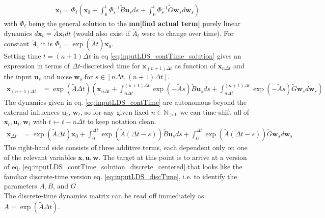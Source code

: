 \documentclass[10pt,letterpaper]{article}
\newcommand{\mn}[1]{   {\bf \color{blue}mn[#1]}  }
\newcommand{\xb}{\mathbf{x}}
\newcommand{\ub}{\mathbf{u}}
\newcommand{\wb}{\mathbf{w}}
\begin{document}
\begin{align}
\xb_t = \Phi_t \left( \xb_0 + \int_0^t \Phi_s^{-1} \tilde{B} \ub_s ds + \int_0^t \Phi_s^{-1} \tilde{G} \wb_s d\wb_s \right) \label{eq:inputLDS_contTime_solution} 
\end{align}
with $\Phi_t$ being the general solution to the \mn{find actual term} purely linear dynamics $d\xb_t = \tilde{A} \xb_t dt$ (would also exist if $\tilde{A}_t$ were to change over time). For constant $\tilde{A}$, it is $\Phi_t = \exp(\tilde{A} t) \xb_0$. \\
Setting time $t =(n+1)\Delta{}t$ in eq \ref{eq:inputLDS_contTime_solution} gives an expression in terms of $\Delta{}t$-discretised time for $\xb_{(n+1)\Delta{}t}$ as function of $\xb_{n\Delta{}t}$ and the input $\ub_s$ and noise $\wb_s$ for $s \in [n\Delta{}t, (n+1)\Delta{}t]$. 
\begin{align}
\xb_{(n+1)\Delta{}t} &= \exp(\tilde{A}\Delta{}t) \left( \xb_{n\Delta{}t} + \int_{n\Delta{}t}^{(n+1)\Delta{}t} \exp(-\tilde{A}s) \tilde{B} \ub_s ds + \int_{n\Delta{}t}^{(n+1)\Delta{}t} \exp(-\tilde{A}s) \tilde{G} \wb_s d\wb_s \right)
 \label{eq:inputLDS_contTime_solution_discrete} 
\end{align}
The dynamics given in eq. \ref{eq:inputLDS_contTime} are autonomous beyond the external influences $\ub_t$, $\wb_t$, so for any given fixed $n \in \mathbb{N}_{>0}$ we can time-shift all of $\xb_t, \ub_t, \wb_t$ with $t \leftarrow t - n \Delta{}t$ to keep notation clean. 
\begin{align}
\xb_{\Delta{}t} &= \exp(\tilde{A}\Delta{}t) \xb_{0} + \int_{0}^{\Delta{}t} \exp(\tilde{A}(\Delta{}t -s)) \tilde{B} \ub_s ds + \int_{0}^{\Delta{}t} \exp(\tilde{A}(\Delta{}t -s)) \tilde{G} \wb_s d\wb_s 
\label{eq:inputLDS_contTime_solution_discrete_centered} 
\end{align}
\noindent{}The right-hand side consists of three additive terms, each dependent only on one of the relevant variables $\xb, \ub, \wb$. The target at this point is to arrive at a version of eq. \ref{eq:inputLDS_contTime_solution_discrete_centered} that looks like the familiar discrete-time version eq. \ref{eq:inputLDS_discTime}, i.e. to identify the parameters $A, B$, and $G$ \\
\noindent{}The discrete-time dynamics matrix can be read off immediately as $A = \exp(\tilde{A}\Delta{}t)$. \\ 
\end{document}
